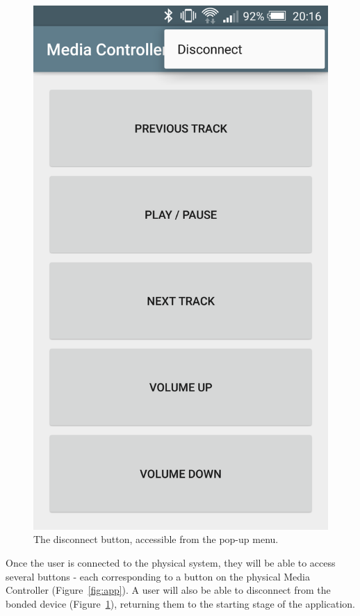 \documentclass{article}
\begin{document}
\begin{figure}[h]
\begin{minipage}[h]{0.29\textwidth}
					\includegraphics[width=\textwidth]{app06}
					\caption{The disconnect button, accessible from the pop-up menu.}
					\label{fig:app06}
				\end{minipage}				
			\end{figure}
			
					
			Once the user is connected to the physical system, they will be able to access several buttons - each corresponding to a button on the physical Media Controller 	(Figure~\ref{fig:app}). A user will also be able to disconnect from the bonded device (Figure~\ref{fig:app06}), returning them to the starting stage of the application.
			
\end{document}
